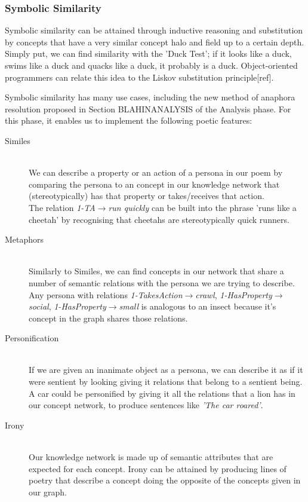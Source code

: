 \subsubsection{Symbolic Similarity}
Symbolic similarity can be attained through inductive reasoning and substitution by concepts that have a very similar concept halo and field up to a certain depth. Simply put, we can find similarity with the 'Duck Test'; if it looks like a duck, swims like a duck and quacks like a duck, it probably is a duck. Object-oriented programmers can relate this idea to the Liskov substitution principle[ref].

Symbolic similarity has many use cases, including the new method of anaphora resolution proposed in Section BLAHINANALYSIS of the Analysis phase. For this phase, it enables us to implement the following poetic features:
\begin{description}
\item[Similes] \hfill \\ We can describe a property or an action of a persona in our poem by comparing the persona to an concept in our knowledge network that (stereotypically) has that property or takes/receives that action. \hfill \\ The relation \textit{1-TA$\rightarrow$run quickly} can be built into the phrase 'runs like a cheetah' by recognising that cheetahs are stereotypically quick runners.
\item[Metaphors] \hfill \\ Similarly to Similes, we can find concepts in our network that share a number of semantic relations with the persona we are trying to describe. \hfill \\ Any persona with relations \textit{1-TakesAction$\rightarrow$crawl}, \textit{1-HasProperty$\rightarrow$social}, \textit{1-HasProperty$\rightarrow$small} is analogous to an insect because it's concept in the graph shares those relations.
\item[Personification] \hfill \\ If we are given an inanimate object as a persona, we can describe it as if it were sentient by looking giving it relations that belong to a sentient being. \hfill \\ A car could be personified by giving it all the relations that a lion has in our concept network, to produce sentences like \textit{'The car roared'}.
\item[Irony] \hfill \\ Our knowledge network is made up of semantic attributes that are expected for each concept. Irony can be attained by producing lines of poetry that describe a concept doing the opposite of the concepts given in our graph.
\end{description} 


